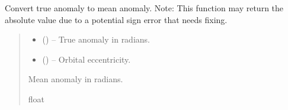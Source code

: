 \documentclass[letterpaper,10pt,english]{sphinxmanual}
\begin{document}
\begin{fulllineitems}
\label{\detokenize{fspsim.utils:fspsim.utils.Conversions.true_to_mean_anomaly}}
\pysigstartsignatures
{}
\pysigstopsignatures
\sphinxAtStartPar
Convert true anomaly to mean anomaly.
Note: This function may return the absolute value due to a potential sign error that needs fixing.
\begin{quote}\begin{description}
\begin{itemize}
\item {} 
\sphinxAtStartPar
{} () – True anomaly in radians.

\item {} 
\sphinxAtStartPar
{} () – Orbital eccentricity.

\end{itemize}

\sphinxAtStartPar
Mean anomaly in radians.

\sphinxAtStartPar
float

\end{description}\end{quote}

\end{fulllineitems}

\end{document}
